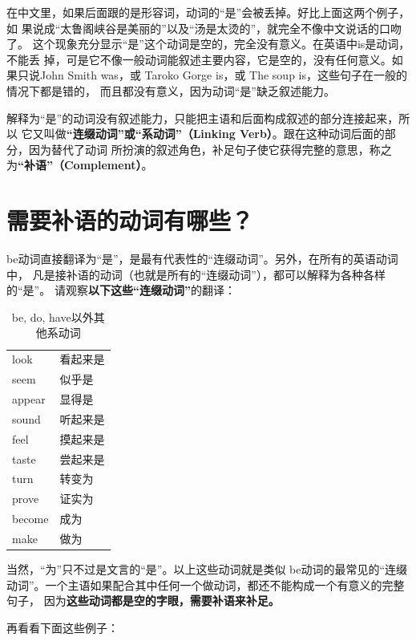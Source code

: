 在中文里，如果后面跟的是形容词，动词的“是”会被丢掉。好比上面这两个例子，如
果说成“太鲁阁峡谷是美丽的”以及“汤是太烫的”，就完全不像中文说话的口吻了。
这个现象充分显示“是”这个动词是空的，完全没有意义。在英语中is是动词，不能丢
掉，可是它不像一般动词能叙述主要内容，它是空的，没有任何意义。如果只说John
Smith was，或 Taroko Gorge is，或 The soup is，这些句子在一般的情况下都是错的，
而且都没有意义，因为动词“是”缺乏叙述能力。

解释为“是”的动词没有叙述能力，只能把主语和后面构成叙述的部分连接起来，所以
它又叫做\textbf{“连缀动词”或“系动词”（Linking Verb）}。跟在这种动词后面的部分，因为替代了动词
所扮演的叙述角色，补足句子使它获得完整的意思，称之为\textbf{“补语”（Complement）}。

\section{需要补语的动词有哪些？}

be动词直接翻译为“是”，是最有代表性的“连缀动词”。另外，在所有的英语动词中，
凡是接补语的动词（也就是所有的“连缀动词”），都可以解释为各种各样的“是”。
请观察\textbf{以下这些“连缀动词”}的翻译：

\begin{longtable}[]{@{}ll@{}}
  \caption{be, do, have以外其他系动词}
  \label{tab:linkverb}
  look & 看起来是 \\
  seem & 似乎是 \\
  appear & 显得是 \\
  sound & 听起来是 \\
  feel & 摸起来是 \\
  taste & 尝起来是 \\
  turn & 转变为 \\
  prove & 证实为 \\
  become & 成为 \\
  make & 做为 \\
\end{longtable}

当然，“为”只不过是文言的“是”。以上这些动词就是类似 be动词的最常见的“连缀
动词”。一个主语如果配合其中任何一个做动词，都还不能构成一个有意义的完整句子，
因为\textbf{这些动词都是空的字眼，需要补语来补足。}

再看看下面这些例子：

